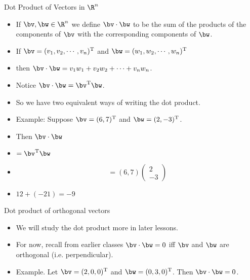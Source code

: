 \documentclass{beamer}
\begin{document}
\begin{frame}{Dot Product of Vectors in $\R^n$}

\begin{itemize}
\item If $\bv, \bw \in \R^n$ we define $\bv \cdot \bw$ to be the sum of the products of the components of $\bv$ with the corresponding components of $\bw$.
\item If $\bv=(v_1, v_2, \cdots , v_n)^{\text{T}}$ and $\bw=(w_1, w_2, \cdots, w_n)^{\text{T}}$
\item then $\bv \cdot \bw = v_1  w_1 +  v_2  w_2 + \cdots +  v_n  w_n$.
\item Notice $\bv \cdot \bw = \bv^{\text{T}} \bw$.
\item So we have two equivalent ways of writing the dot product.
\item Example: Suppose $\bv = (6, 7)^{\text{T}}$ and $\bw=(2, -3)^{\text{T}}$.
\item Then $\bv \cdot \bw$
\item $=\bv^{\text{T}} \bw$
\item
$$
= (6, 7) \begin{pmatrix} 2 \\ -3 \end{pmatrix}
$$
\item $12 + (-21) = -9$
\end{itemize}

\end{frame}

\begin{frame}{Dot product of orthogonal vectors}

\begin{itemize}
\item We will study the dot product more in later lessons.
\item For now, recall from earlier classes $\bv \cdot \bw = 0$ iff
$\bv$ and $\bw$ are orthogonal (i.e. perpendicular).
\item Example. Let $\bv=(2, 0, 0)^{\text{T}}$ and $\bw = (0, 3, 0)^{\text{T}}$.
Then $\bv \cdot \bw = 0$.
\end{itemize}

\end{frame}
\end{document}
